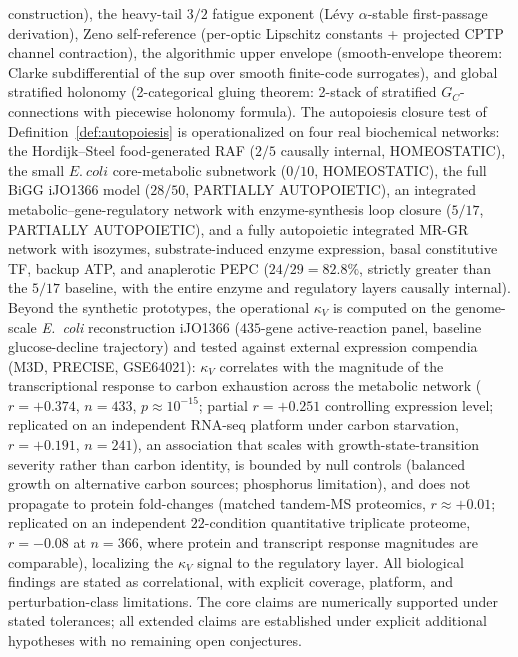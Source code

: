 \documentclass[11pt,a4paper]{article}
\theoremstyle{plain}
\theoremstyle{definition}
\theoremstyle{remark}
\newcommand{\kk}{\kappa_{\!V}}
\begin{document}
\begin{center}
\begin{minipage}{0.92\textwidth}
construction), the heavy-tail $3/2$ fatigue exponent (L\'evy
$\alpha$-stable first-passage derivation), Zeno self-reference
(per-optic Lipschitz constants + projected CPTP channel contraction),
the algorithmic upper envelope (smooth-envelope theorem: Clarke
subdifferential of the sup over smooth finite-code surrogates), and
global stratified holonomy (2-categorical gluing theorem: 2-stack of
stratified $G_C$-connections with piecewise holonomy formula).
The autopoiesis closure test of Definition~\ref{def:autopoiesis} is
operationalized on four real biochemical networks: the Hordijk--Steel
food-generated RAF ($2/5$ causally internal, HOMEOSTATIC), the small
$E.~coli$ core-metabolic subnetwork ($0/10$, HOMEOSTATIC), the full
BiGG iJO1366 model ($28/50$, PARTIALLY AUTOPOIETIC), an integrated
metabolic--gene-regulatory network with enzyme-synthesis loop closure
($5/17$, PARTIALLY AUTOPOIETIC), and a fully autopoietic integrated
MR-GR network with isozymes, substrate-induced enzyme expression, basal
constitutive TF, backup ATP, and anaplerotic PEPC ($24/29 = 82.8\%$,
strictly greater than the $5/17$ baseline, with the entire enzyme
and regulatory layers causally internal). Beyond the synthetic
prototypes, the operational $\kk$ is computed on the genome-scale
\emph{E.~coli} reconstruction iJO1366 ($435$-gene active-reaction
panel, baseline glucose-decline trajectory) and tested against
external expression compendia (M3D, PRECISE, GSE64021): $\kk$
correlates with the magnitude of the transcriptional response to
carbon exhaustion across the metabolic network ($r = +0.374$,
$n = 433$, $p \approx 10^{-15}$; partial $r = +0.251$ controlling
expression level; replicated on an independent RNA-seq platform
under carbon starvation, $r = +0.191$, $n = 241$), an association
that scales with growth-state-transition severity rather than
carbon identity, is bounded by null controls (balanced growth on
alternative carbon sources; phosphorus limitation), and does not
propagate to protein fold-changes (matched tandem-MS proteomics,
$r \approx +0.01$; replicated on an independent $22$-condition
quantitative triplicate proteome, $r = -0.08$ at $n = 366$, where
protein and transcript response magnitudes are comparable), 
localizing the $\kk$ signal to the regulatory layer. All biological findings are stated as correlational, with
explicit coverage, platform, and perturbation-class limitations.
The core claims are numerically
supported under stated tolerances; all extended claims are established
under explicit additional hypotheses with no remaining open
conjectures.
\par
\end{minipage}
\end{center}
\end{document}
